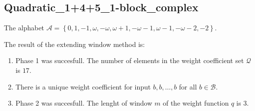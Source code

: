 \subsection{ Quadratic\_1+4+5\_1-block\_complex }

\label{subsec:Quadratic1+4+51-blockcomplex}

The alphabet $\mathcal{A} =\left\{0, 1, -1, \omega, -\omega, \omega + 1, -\omega - 1, \omega - 1, -\omega - 2, -2\right\}$.

\noindent The result of the extending window method is:
\begin{enumerate}
    \item Phase 1 was succesfull.
The number of elements in the weight coefficient set $\mathcal{Q}$ is $17$.

    \item There is a unique weight coefficient for input $b,b,\dots,b$ for all $b\in\mathcal{B}$.

    \item Phase 2 was succesfull.
The lenght of window $m$ of the weight function $q$ is 3.
\end{enumerate}
